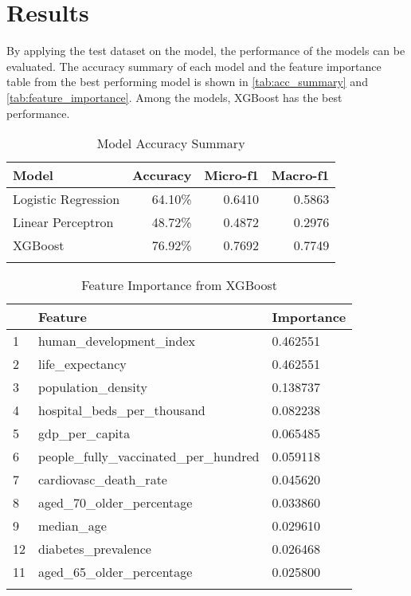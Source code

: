 \documentclass[10pt, a4paper, twocolumn]{article} %
\begin{document}
\section{Results}
By applying the test dataset on the model, the performance of the models can be evaluated. The accuracy summary of each 
model and the feature importance table from the best performing model is shown in \autoref{tab:acc_summary} and 
\autoref{tab:feature_importance}. Among the models, XGBoost has the best performance.
\begin{table}
	\caption{Model Accuracy Summary}
	\centering
	\begin{tabular}{lrrr}
		\toprule
		\textbf{Model} & \textbf{Accuracy} & \textbf{Micro-f1} & \textbf{Macro-f1} \\
		\midrule
		Logistic Regression & 64.10\% & 0.6410 & 0.5863 \\
		Linear Perceptron & 48.72\% & 0.4872 & 0.2976 \\
		XGBoost & 76.92\% & 0.7692 &0.7749 \\
		\bottomrule
	\label{tab:acc_summary}
	\end{tabular}
\end{table}
\begin{table}
	\caption{Feature Importance from XGBoost}
	\centering
	\begin{tabular}{lll}
		\toprule
		& \textbf{Feature} & \textbf{Importance} \\
		\midrule
		1&human\_development\_index & 0.462551 \\
		2& life\_expectancy& 0.462551\\
		3& population\_density& 0.138737\\
		4& hospital\_beds\_per\_thousand& 0.082238\\
		5& gdp\_per\_capita& 0.065485\\
		6& people\_fully\_vaccinated\_per\_hundred& 0.059118\\
		7& cardiovasc\_death\_rate& 0.045620\\
		8& aged\_70\_older\_percentage& 0.033860\\
		9& median\_age& 0.029610\\
		12& diabetes\_prevalence& 0.026468\\
		11& aged\_65\_older\_percentage& 0.025800\\
		\bottomrule
	\label{tab:feature_importance}
	\end{tabular}
\end{table}
\end{document}
